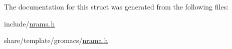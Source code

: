 \-The documentation for this struct was generated from the following files\-:\begin{DoxyCompactItemize}
\item 
include/\hyperlink{include_2nrama_8h}{nrama.\-h}\item 
share/template/gromacs/\hyperlink{share_2template_2gromacs_2nrama_8h}{nrama.\-h}\end{DoxyCompactItemize}
